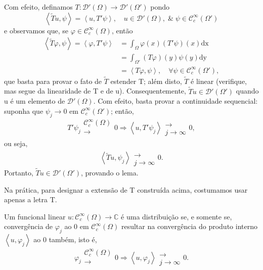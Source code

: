 \documentclass[../distribution_theory_notes.tex]{subfiles}
\begin{document}
\begin{proof*}
  Com efeito, definamos \(T:\mathcal{D}'(\Omega )\rightarrow \mathcal{D}'(\Omega ')\) pondo 
    \[
      \left< \tilde{T}u, \psi  \right> = \left< u, T'\psi  \right>,\quad u\in \mathcal{D}'(\Omega ),\;\&\;\psi \in \mathcal{C}_{c}^{\infty}(\Omega ')
    \]
    e observamos que, se \(\varphi \in \mathcal{C}_{c}^{\infty}(\Omega )\), então 
   \begin{align*}
     \left< \tilde{T}\varphi , \psi  \right> = \left< \varphi , T'\psi  \right> &= \int_{\Omega }^{}\varphi (x)(T'\psi )(x) \mathrm{dx}\\ 
                                                                                &= \int_{\Omega '}^{}(T\varphi )(y)\psi (y) \mathrm{dy}\\ 
                                                                                &= \left< T\varphi , \psi  \right>,\quad \forall \psi \in \mathcal{C}_{c}^{\infty}(\Omega '),
   \end{align*}
   que basta para provar o fato de \(\tilde{T}\) estender T; além disto, \(\tilde{T}\) é linear (verifique, mas segue da linearidade de T e de u). Consequentemente, \(\tilde{T}u\in \mathcal{D}'(\Omega ')\) quando u é um elemento de \(\mathcal{D}'(\Omega )\). Com efeito, basta provar a continuidade sequencial: suponha que \(\psi_{j}\rightarrow 0\) em \(\mathcal{C}_{c}^{\infty}(\Omega ')\); então, 
     \[
       T'\psi_{j}\substack{\mathcal{C}_{c}^{\infty}(\Omega ) \\ \longrightarrow \\ }0 \Rightarrow \left< u, T'\psi_{j} \right>\substack{ \\ \longrightarrow \\ j\to \infty}0,
     \]
     ou seja, 
       \[
         \left< \tilde{T}u, \psi_{j} \right>\substack{ \\ \longrightarrow \\ j\to \infty}0.
       \]
       Portanto, \(\tilde{T}u\in \mathcal{D}'(\Omega ')\), provando o lema. \qedsymbol
\end{proof*}
  \begin{tcolorbox}[
  skin=enhanced,
  title=Observação,
  fonttitle=\bfseries,
colframe=black,
  colbacktitle=cyan!75!white, 
  colback=cyan!15,
  colbacklower=black,
coltitle=black,
  drop fuzzy shadow,
  ]
  Na prática, para designar a extensão de T construída acima, costumamos usar apenas a letra T.
  \end{tcolorbox}
 \begin{lemma*}
   Um funcional linear \(u:\mathcal{C}_{c}^{\infty}(\Omega )\rightarrow \mathbb{C}\) é uma distribuição se, e somente se,  convergência de \(\varphi_{j}\) ao 0 em \(\mathcal{C}_{c}^{\infty}(\Omega )\) resultar na convergência do produto interno \(\left< u, \varphi_{j} \right>\) ao 0 também, isto é, 
     \[
       \varphi_{j}\substack{\mathcal{C}_{c}^{\infty}(\Omega ) \\ \longrightarrow \\ }0 \Rightarrow \left< u, \varphi_{j} \right>\substack{ \\ \longrightarrow \\ j\to\infty}0.
     \]
 \end{lemma*}
\end{document}

